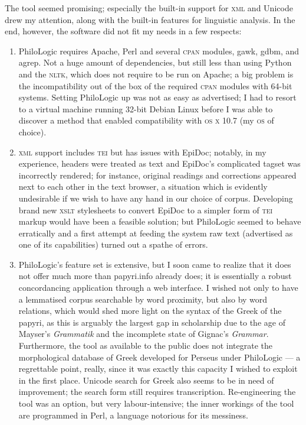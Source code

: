 The tool seemed promising; especially the built-in support for \textsc{xml} and
Unicode drew my attention, along with the built-in features for linguistic
analysis. In the end, however, the software did not fit my needs in a few
respects: \begin{enumerate}

\item PhiloLogic requires Apache, Perl and several \textsc{cpan} modules, gawk,
  gdbm, and agrep.  Not a huge amount of dependencies, but still less than
  using Python and the \textsc{nltk}, which does not require to be run on
  Apache; a big problem is the incompatibility out of the box of the required
  \textsc{cpan} modules with 64-bit systems. Setting PhiloLogic up was not as
  easy as advertised; I had to resort to a virtual machine running 32-bit
  Debian Linux before I was able to discover a method that enabled
  compatibility with \textsc{os x} 10.7 (my \textsc{os} of choice).

\item \textsc{xml} support includes \textsc{tei} but has issues with EpiDoc;
  notably, in my experience, headers were treated as text and EpiDoc's
  complicated tagset was incorrectly rendered; for instance, original readings
  and corrections appeared next to each other in the text browser, a situation
  which is evidently undesirable if we wish to have any hand in our choice of
  corpus.  Developing brand new \textsc{xslt} stylesheets to convert EpiDoc to
  a simpler form of \textsc{tei} markup would have been a feasible solution;
  but PhiloLogic seemed to behave erratically and a first attempt at feeding
  the system raw text (advertised as one of its capabilities) turned out a
  spathe of errors.

\item PhiloLogic's feature set is extensive, but I soon came to realize that it
  does not offer much more than papyri.info already does; it is essentially a
  robust concordancing application through a web interface. I wished not only
  to have a lemmatised corpus searchable by word proximity, but also by word
  relations, which would shed more light on the syntax of the Greek of the
  papyri, as this is arguably the largest gap in scholarship due to the age of
  Mayser's \emph{Grammatik} and the incomplete state of Gignac's
  \emph{Grammar}. Furthermore, the tool as available to the public does not
  integrate the morphological database of Greek developed for Perseus under
  PhiloLogic --- a regrettable point, really, since it was exactly this
  capacity I wished to exploit in the first place. Unicode search for Greek
  also seems to be in need of improvement; the search form still requires
  transcription. Re-engineering the tool was an option, but very
  labour-intensive; the inner workings of the tool are programmed in Perl, a
  language notorious for its messiness.

\end{enumerate}

